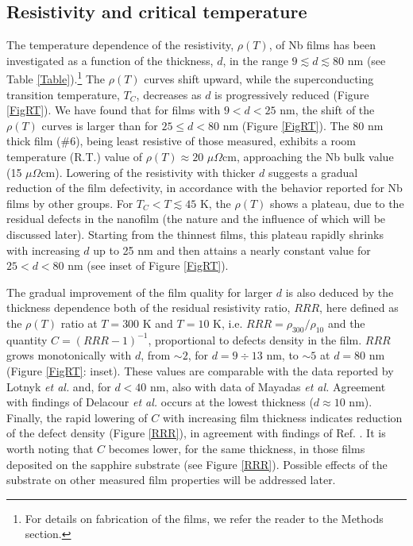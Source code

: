 \documentclass[reprint,onecolumn,superscriptaddress,a4paper,nofootinbib,floatfix]{revtex4-1}
\begin{document}
\subsection*{Resistivity and critical temperature}
The temperature dependence of the resistivity, $\rho(T)$, of Nb films has been investigated as a function of the thickness, $d$, in the range $9 \lesssim d \lesssim 80$ nm (see Table \ref{Table}).\footnote{For details on fabrication of the films, we refer the reader to the Methods section.} 
The $\rho(T)$ curves shift upward, while the superconducting transition temperature, $T_C$, decreases as $d$ is progressively reduced (Figure \ref{FigRT}). We have found that for films with $9 < d < 25$ nm, the shift of the $\rho(T)$ curves is larger than for $25 \leq d < 80$ nm (Figure \ref{FigRT}). 
The 80 nm thick film ($\#6$), being least resistive of those measured, exhibits a room temperature (R.T.) value of $\rho(T) \approx 20$ $\mu\Omega$cm, approaching the Nb bulk value (15 $\mu\Omega$cm).\cite{Bulk_res1,Bulk_res2} Lowering of the resistivity with thicker $d$ suggests a gradual reduction of the film defectivity, in accordance with the behavior reported for Nb films by other groups.\cite{Zhao,Delacour,Gubin2005}
For $T_C < T \lesssim 45$ K, the $\rho(T)$ shows a plateau, due to the residual defects in the nanofilm (the nature and the influence of which will be discussed later). 
Starting from the thinnest films, this plateau rapidly shrinks with increasing $d$ up to 25 nm and then attains a nearly constant value for $25 < d < 80$ nm (see inset of Figure \ref{FigRT}). 

The gradual improvement of the film quality for larger $d$ is also deduced by the thickness dependence both of the residual resistivity ratio, $RRR$, here defined as the $\rho(T)$ ratio at $T = 300$ K and $T= 10$ K, i.e. $RRR = \rho_{300}/\rho_{10}$\cite{Lotnyk2016} and the quantity $C = (RRR-1)^{-1}$, proportional to defects density in the film.\cite{Delacour} 
$RRR$ grows monotonically with $d$, from $\sim 2$, for $d = 9\div13$ nm, to $\sim 5$ at $d = 80$ nm (Figure \ref{FigRT}: inset). These values are comparable with the data reported by Lotnyk \textit{et al.}\cite{Lotnyk2016} and, for $d < 40$ nm, also with data of Mayadas \textit{et al.}\cite{Mayadas1972} 
Agreement with findings of Delacour \textit{et al.}\cite{Delacour} occurs at the lowest thickness ($d \approx 10$ nm). 
Finally, the rapid lowering of $C$ with increasing film thickness indicates reduction of the defect density (Figure \ref{RRR}), in agreement with findings of Ref. \cite{Delacour}. It is worth noting that $C$ becomes lower, for the same thickness, in those films deposited on the sapphire substrate (see Figure \ref{RRR}). Possible effects of the substrate on other measured film properties will be addressed later.
\end{document}
